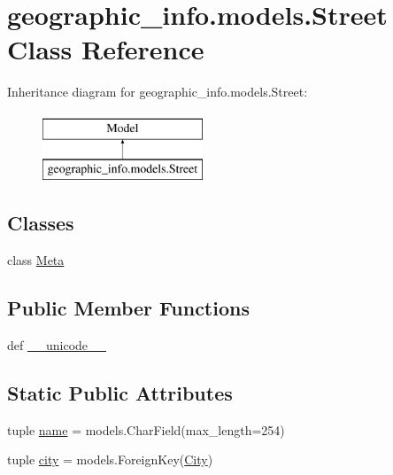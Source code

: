 \hypertarget{classgeographic__info_1_1models_1_1_street}{\section{geographic\-\_\-info.\-models.\-Street Class Reference}
\label{classgeographic__info_1_1models_1_1_street}
}
Inheritance diagram for geographic\-\_\-info.\-models.\-Street\-:\begin{figure}[H]
\begin{center}
\leavevmode
\includegraphics[height=2.000000cm]{classgeographic__info_1_1models_1_1_street}
\end{center}
\end{figure}
\subsection*{Classes}
\begin{DoxyCompactItemize}
\item 
class \hyperlink{classgeographic__info_1_1models_1_1_street_1_1_meta}{Meta}
\end{DoxyCompactItemize}
\subsection*{Public Member Functions}
\begin{DoxyCompactItemize}
\item 
def \hyperlink{classgeographic__info_1_1models_1_1_street_afb471419a9c0e6e5a595b54c838d89d7}{\-\_\-\-\_\-unicode\-\_\-\-\_\-}
\end{DoxyCompactItemize}
\subsection*{Static Public Attributes}
\begin{DoxyCompactItemize}
\item 
tuple \hyperlink{classgeographic__info_1_1models_1_1_street_a67ed0da0011cc008874b3b094483224b}{name} = models.\-Char\-Field(max\-\_\-length=254)
\item 
tuple \hyperlink{classgeographic__info_1_1models_1_1_street_a250afacbb6aaf8ca3fa6bf92ae6e0d2e}{city} = models.\-Foreign\-Key(\hyperlink{classgeographic__info_1_1models_1_1_city}{City})
\end{DoxyCompactItemize}


